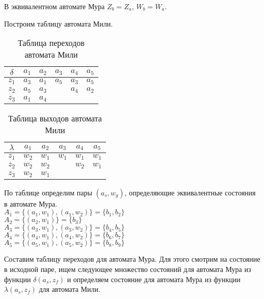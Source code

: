 \documentclass[a4paper,10pt]{article}
\begin{document}
        В эквивалентном автомате Мура $Z_b = Z_a$, $W_b = W_a$.

        Построим таблицу автомата Мили.

        \begin{table}[!h]
            \begin{tabular} {|c|c|c|c|c|c|}
                \hline
                $\delta$ & $a_1$ & $a_2$ & $a_3$ & $a_4$ & $a_5$ \\ \hline
                $z_1$  & $a_3$ & $a_1$ & $a_5$ & $a_3$ & $a_5$ \\ \hline
                $z_2$  & $a_5$ & $a_3$ &       & $a_4$ & $a_2$ \\ \hline
                $z_3$  & $a_1$ & $a_4$ &       &       &       \\ \hline
            \end{tabular}
            \caption{Таблица переходов автомата Мили}
        \end{table}
        \begin{table}[!h]
            \begin{tabular} {|c|c|c|c|c|c|}
                \hline
                $\lambda$ & $a_1$ & $a_2$ & $a_3$ & $a_4$ & $a_5$ \\ \hline
                $z_1$  & $w_2$ & $w_1$ & $w_1$ & $w_1$ & $w_1$ \\ \hline
                $z_2$  & $w_2$ & $w_2$ &       & $w_2$ & $w_1$ \\ \hline
                $z_3$  & $w_2$ & $w_1$ &       &       &       \\ \hline
            \end{tabular}
            \caption{Таблица выходов автомата Мили}
        \end{table}
    
        По таблице определим пары $(a_s, w_g)$, определяющие эквивалентные состояния в автомате Мура. \\
        $A_1 = \{ (a_1, w_1), (a_1, w_2) \} = \{ b_1, b_2 \}$ \\
        $A_2 = \{ (a_2, w_1) \} = \{ b_3 \}$ \\
        $A_3 = \{ (a_3, w_1), (a_3, w_2) \} = \{ b_4, b_5 \}$ \\
        $A_4 = \{ (a_4, w_1), (a_4, w_2) \} = \{ b_6, b_7 \}$ \\
        $A_5 = \{ (a_5, w_1), (a_5, w_2) \} = \{ b_8, b_9 \}$


        Составим таблицу переходов для автомата Мура. Для этого смотрим на состояние в исходной паре,
        ищем следующее множество состояний для автомата Мура из функции $\delta(a_s, z_f)$ и определяем
        состояние для автомата Мура из функции $\lambda(a_s, z_f)$ для автомата Мили. 
\end{document}
